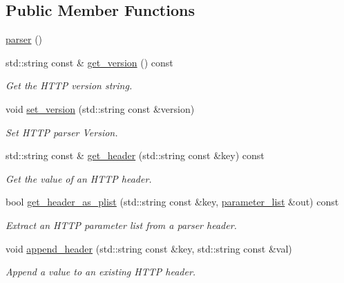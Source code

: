 \subsection*{Public Member Functions}
\begin{DoxyCompactItemize}
\item 
\hyperlink{classwebsocketpp_1_1http_1_1parser_1_1parser_a11bc97bfd504dd56ad7b8262a940a9c5}{parser} ()
\item 
std\+::string const \& \hyperlink{classwebsocketpp_1_1http_1_1parser_1_1parser_a382bce24a437c9cf07485a34dd0489b0}{get\+\_\+version} () const 
\begin{DoxyCompactList}\small\item\em Get the H\+T\+T\+P version string. \end{DoxyCompactList}\item 
void \hyperlink{classwebsocketpp_1_1http_1_1parser_1_1parser_a5c2e0e2bc0b2769db5a785b7d47a66ee}{set\+\_\+version} (std\+::string const \&version)
\begin{DoxyCompactList}\small\item\em Set H\+T\+T\+P parser Version. \end{DoxyCompactList}\item 
std\+::string const \& \hyperlink{classwebsocketpp_1_1http_1_1parser_1_1parser_a6a2a10752449789e6a2af06972c53d94}{get\+\_\+header} (std\+::string const \&key) const 
\begin{DoxyCompactList}\small\item\em Get the value of an H\+T\+T\+P header. \end{DoxyCompactList}\item 
bool \hyperlink{classwebsocketpp_1_1http_1_1parser_1_1parser_a0904316d798a3d74efcffa803ce08610}{get\+\_\+header\+\_\+as\+\_\+plist} (std\+::string const \&key, \hyperlink{namespacewebsocketpp_1_1http_a2c285bc959df5a63bf962bed842fccfb}{parameter\+\_\+list} \&out) const 
\begin{DoxyCompactList}\small\item\em Extract an H\+T\+T\+P parameter list from a parser header. \end{DoxyCompactList}\item 
void \hyperlink{classwebsocketpp_1_1http_1_1parser_1_1parser_abd39762de5ec467a29a537d79602b603}{append\+\_\+header} (std\+::string const \&key, std\+::string const \&val)
\begin{DoxyCompactList}\small\item\em Append a value to an existing H\+T\+T\+P header. \end{DoxyCompactList}\item 

\end{DoxyCompactItemize}
